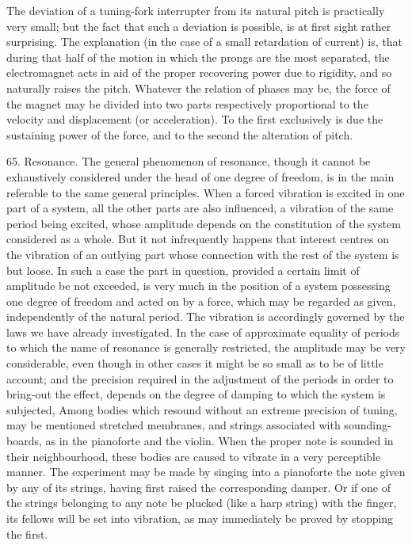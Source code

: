 The deviation of a tuning-fork interrupter from its natural pitch is
practically very small; but the fact that such a deviation is possible, is at
first sight rather surprising. The explanation (in the case of a small
retardation of current) is, that during that half of the motion in which the
prongs are the most separated, the electromagnet acts in aid of the proper
recovering power due to rigidity, and so naturally raises the pitch. Whatever
the relation of phases may be, the force of the magnet may be divided into two
parts respectively proportional to the velocity and displacement (or
acceleration). To the first exclusively is due the sustaining power of the
force, and to the second the alteration of pitch.

65.  Resonance.
The general phenomenon of resonance, though it cannot be exhaustively
considered under the head of one degree of freedom, is in the main referable to
the same general principles. When a forced vibration is excited in one part of
a system, all the other parts are also influenced, a vibration of the same
period being excited, whose amplitude depends on the constitution of the system
considered as a whole. But it not infrequently happens that interest centres on
the vibration of an outlying part whose connection with the rest of the system
is but loose. In such a case the part in question, provided a certain limit of
amplitude be not exceeded, is very much in the position of a system possessing
one degree of freedom and acted on by a force, which may be regarded as given,
independently of the natural period. The vibration is accordingly governed by
the laws we have already investigated. In the case of approximate equality of
periods to which the name of resonance is generally restricted, the amplitude
may be very considerable, even though in other cases it might be so small as to
be of little account; and the precision required in the adjustment of the
periods in order to bring-out the effect, depends on the degree of damping to
which the system is subjected, Among bodies which resound without an extreme
precision of tuning, may be mentioned stretched membranes, and strings
associated with sounding-boards, as in the pianoforte and the violin. When the
proper note is sounded in their neighbourhood, these bodies are caused to
vibrate in a very perceptible manner. The experiment may be made by singing
into a pianoforte the note given by any of its strings, having first raised the
corresponding damper. Or if one of the strings belonging to any note be plucked
(like a harp string) with the finger, its fellows will be set into vibration,
as may immediately be proved by stopping the first.

